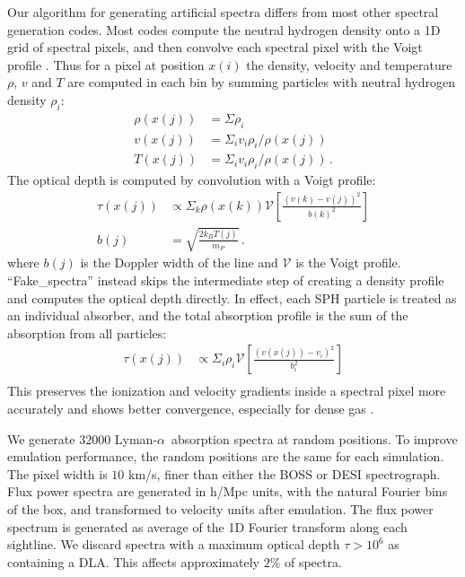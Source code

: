 \documentclass[a4paper,11pt]{article}
\newcommand{\Lya}{Lyman-$\alpha$}
\begin{document}
Our algorithm for generating artificial spectra differs from most other spectral generation codes. Most codes compute the neutral hydrogen density onto a 1D grid of spectral pixels, and then convolve each spectral pixel with the Voigt profile \cite[e.g.~]{Theuns:1998, Chabanier:2022}. Thus for a pixel at position $x(i)$ the density, velocity and temperature $\rho$, $v$ and $T$ are computed in each bin by summing particles with neutral hydrogen density $\rho_i$:
\begin{align}
 \rho(x(j)) &= \Sigma \rho_i \\
 v(x(j)) &= \Sigma_i v_i \rho_i / \rho(x(j)) \\
 T(x(j)) &= \Sigma_i v_i \rho_i / \rho(x(j))\,.
\end{align}
The optical depth is computed by convolution with a Voigt profile:
\begin{align}
 \tau(x(j)) &\propto \Sigma_k \rho(x(k)) \mathcal{V}\left[\frac{(v(k) - v(j))^2}{b(k)^2}\right] \\
 b(j) &= \sqrt{\frac{2 k_B T(j)}{m_P}}\,.
\end{align}
where $b(j)$ is the Doppler width of the line and $\mathcal{V}$ is the Voigt profile.
``Fake\_spectra'' instead skips the intermediate step of creating a density profile and computes the optical depth directly. In effect, each SPH particle is treated as an individual absorber, and the total absorption profile is the sum of the absorption from all particles:
\begin{align}
 \tau(x(j)) &\propto \Sigma_i \rho_i \mathcal{V}\left[\frac{(v(x(j)) - v_i)^2}{b_i^2}\right] \\
\end{align}
This preserves the ionization and velocity gradients inside a spectral pixel more accurately and shows better convergence, especially for dense gas \cite{Bird:2015}.

We generate $32000$ \Lya~absorption spectra at random positions. To improve emulation performance, the random positions are the same for each simulation. The pixel width is $10$ km/s, finer than either the BOSS or DESI spectrograph. Flux power spectra are generated in h/Mpc units, with the natural Fourier bins of the box, and transformed to velocity units after emulation. The flux power spectrum is generated as average of the 1D Fourier transform along each sightline. We discard spectra with a maximum optical depth $\tau > 10^6$ as containing a DLA. This affects approximately $2\%$ of spectra.
\end{document}
